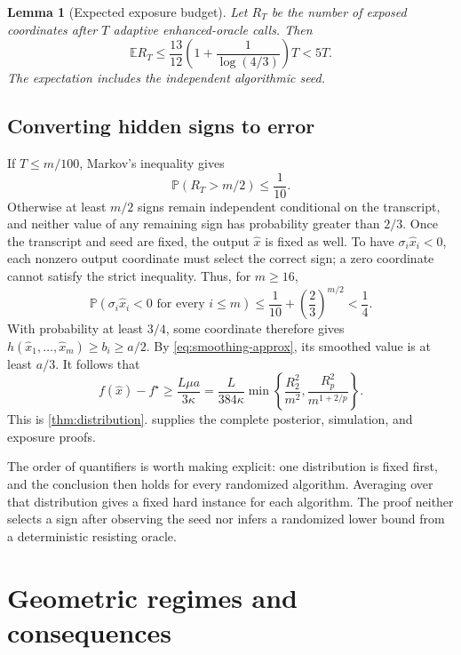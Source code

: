 \documentclass[11pt]{article}
\newcommand{\E}{\mathbb{E}}
\newcommand{\Prob}{\mathbb{P}}
\newtheorem{lemma}[lemma]{Lemma}
\theoremstyle{definition}
\theoremstyle{remark}
\begin{document}
\begin{lemma}[Expected exposure budget]
\label{lem:budget}
Let $R_T$ be the number of exposed coordinates after $T$ adaptive
enhanced-oracle calls. Then
\begin{equation}
\label{eq:budget}
 \E R_T\le
 \frac{13}{12}\left(1+\frac1{\log(4/3)}\right)T<5T.
\end{equation}
The expectation includes the independent algorithmic seed.
\end{lemma}

\subsection{Converting hidden signs to error}

If $T\le m/100$, Markov's inequality gives
\begin{equation}
\label{eq:half-hidden}
 \Prob(R_T>m/2)\le\frac1{10}.
\end{equation}
Otherwise at least $m/2$ signs remain independent conditional on the
transcript, and neither value of any remaining sign has probability
greater than $2/3$. Once the transcript and seed are fixed, the output
$\widehat x$ is fixed as well. To have
$\sigma_i\widehat x_i<0$, each nonzero output coordinate must select
the correct sign; a zero coordinate cannot satisfy the strict
inequality. Thus, for $m\ge16$,
\begin{equation}
\label{eq:sign-error}
 \Prob(\sigma_i\widehat x_i<0\text{ for every }i\le m)
 \le\frac1{10}+\left(\frac23\right)^{m/2}<\frac14.
\end{equation}
With probability at least $3/4$, some coordinate therefore gives
$h(\widehat x_1,\ldots,\widehat x_m)\ge b_i\ge a/2$.
By \cref{eq:smoothing-approx}, its smoothed value is at least $a/3$.
It follows that
\[
 f(\widehat x)-f^\star
 \ge\frac{L\mu a}{3\kappa}
 =\frac{L}{384\kappa}
 \min\left\{\frac{R_2^2}{m^2},
             \frac{R_p^2}{m^{1+2/p}}\right\}.
\]
This is \cref{thm:distribution}.  supplies the
complete posterior, simulation, and exposure proofs.

The order of quantifiers is worth making explicit: one distribution
is fixed first, and the conclusion then holds for every randomized
algorithm. Averaging over that distribution gives a fixed hard
instance for each algorithm. The proof neither selects a sign after
observing the seed nor infers a randomized lower bound from a
deterministic resisting oracle.


\section{Geometric regimes and consequences}
\label{sec:implications}
\end{document}
